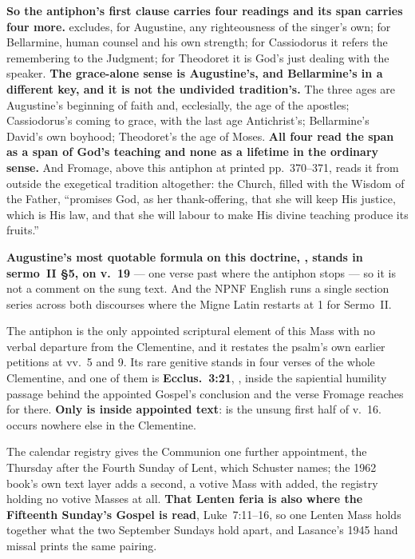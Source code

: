 \textbf{So the antiphon's first clause carries four readings and its span
carries four more.}  excludes, for Augustine, any righteousness of
the singer's own; for Bellarmine, human counsel and his own strength; for
Cassiodorus it refers the remembering to the Judgment; for Theodoret it is God's
just dealing with the speaker. \textbf{The grace-alone sense is Augustine's, and
Bellarmine's in a different key, and it is not the undivided tradition's.} The
three ages are Augustine's beginning of faith and, ecclesially, the age of the
apostles; Cassiodorus's coming to grace, with the last age Antichrist's;
Bellarmine's David's own boyhood; Theodoret's the age of Moses.
\textbf{All four read the span as a span of God's teaching and none as a lifetime
in the ordinary sense.} And Fromage, above this antiphon at printed
pp.~370--371, reads it from outside the exegetical tradition altogether: the
Church, filled with the Wisdom of the Father, ``promises God, as her
thank-offering, that she will keep His justice, which is His law, and that she
will labour to make His divine teaching produce its fruits.''

\textbf{Augustine's most quotable formula on this doctrine, , stands in sermo~II \S5, on v.~19} --- one verse past
where the antiphon stops --- so it is not a comment on the sung text. And the
NPNF English runs a single section series across both discourses where the Migne
Latin restarts at 1 for Sermo~II.

The antiphon is the only appointed scriptural element of this Mass with no
verbal departure from the Clementine, and it restates the psalm's own earlier
petitions at vv.~5 and 9. Its rare genitive  stands in four verses
of the whole Clementine, and one of them is \textbf{Ecclus.~3:21},
, inside the
sapiential humility passage behind the appointed Gospel's conclusion and the
verse Fromage reaches for there. \textbf{Only  is inside
appointed text}:  is the unsung first half of v.~16.
 occurs nowhere else in the Clementine.

The calendar registry gives the Communion one further appointment, the Thursday
after the Fourth Sunday of Lent, which Schuster names; the 1962 book's own text
layer adds a second, a votive Mass  with
 added, the registry holding no votive Masses at all.
\textbf{That
Lenten feria is also where the Fifteenth Sunday's Gospel is read}, Luke~7:11--16,
so one Lenten Mass holds together what the two September Sundays hold apart, and
Lasance's 1945 hand missal prints the same pairing.

